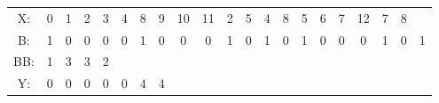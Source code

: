 \begin{tabular}{c|c|c|c|c|c|c|c|c|c|c|c|c|c|c|c|c|c|c|c|c|}
	\cline{2-20}
	X: & 0 & 1 & 2 & 3 & 4 & 8 & 9 & 10 & 11 & 2 & 5 & 4 & 8 & 5 & 6 & 7 & 12 & 7 & 8  \\	
	\cline{2-21}
	B: & 1 & 0 & 0 & 0 & 0 & 1 & 0 & 0 & 0 & 1 & 0 & 1 & 0 & 1 & 0 & 0 & 0 & 1 & 0 & 1\\
	\cline{2-21}
	BB: & 1 & 3 & 3 & 2 \\
	\cline{2-8}
	Y: & 0 & 0 & 0 & 0 & 0 & 4 & 4\\
	\cline{2-8}
\end{tabular}